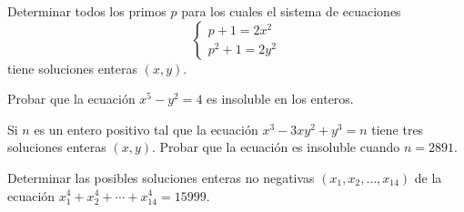 \begin{problem}
    Determinar todos los primos $p$ para los cuales el sistema de ecuaciones
    \[
        \begin{cases}
            p + 1 = 2x^2\\
            p^2 + 1 = 2y^2
        \end{cases}
    \]
    tiene soluciones enteras $(x,y)$.
\end{problem}

\begin{problem}
    Probar que la ecuación $x^5 - y^2 = 4$ es insoluble en los enteros.
\end{problem}

\begin{problem}
    Si $n$ es un entero positivo tal que la ecuación $x^3 - 3xy^2 + y^3 = n$ tiene tres soluciones enteras $(x,y)$.
    Probar que la ecuación es insoluble cuando $n = 2891$.
\end{problem}

\begin{problem}
    Determinar las posibles soluciones enteras no negativas $(x_1, x_2, \ldots, x_{14})$ de la ecuación $x_1^4 + x_2^4 + \cdots + x_{14}^4 = 15999$.
\end{problem}
